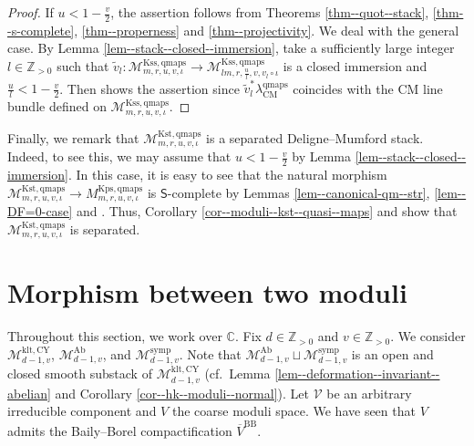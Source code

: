 \documentclass[12pt,twoside]{amsart}
\theoremstyle{definition}
\begin{document}
\begin{proof}
    If $u<1-\frac{v}{2}$, the assertion follows from Theorems \ref{thm--quot--stack}, \ref{thm--s-complete}, \ref{thm--properness} and \ref{thm--projectivity}.
We deal with the general case.
By Lemma \ref{lem--stack--closed--immersion}, take a sufficiently large integer $l\in\mathbb{Z}_{>0}$ such that  $\tilde{v}_l\colon\mathcal{M}^{\mathrm{Kss,qmaps}}_{m,r,u,v,\iota}\to\mathcal{M}^{\mathrm{Kss,qmaps}}_{lm,r,\frac{u}{l},v,v_l\circ\iota}$ is a closed immersion and $\frac{u}{l}<1-\frac{v}{2}$.
Then \cite[Lemma 4.14]{alper} shows the assertion since $\tilde{v}_l^*\lambda_{\mathrm{CM}}^{\mathrm{qmaps}}$ coincides with the CM line bundle defined on $\mathcal{M}^{\mathrm{Kss,qmaps}}_{m,r,u,v,\iota}$.
\end{proof}

Finally, we remark that $\mathcal{M}^{\mathrm{Kst,qmaps}}_{m,r,u,v,\iota}$ is a separated Deligne--Mumford stack.
Indeed, to see this, we may assume that $u<1-\frac{v}{2}$ by Lemma \ref{lem--stack--closed--immersion}.
In this case, it is easy to see that the natural morphism $\mathcal{M}^{\mathrm{Kst,qmaps}}_{m,r,u,v,\iota}\to M^{\mathrm{Kps,qmaps}}_{m,r,u,v,\iota}$ is $\mathsf{S}$-complete by Lemmas \ref{lem--canonical-qm--str}, \ref{lem--DF=0-case} and \cite[Proposition 3.43 (3)]{AHLH}.
Thus, Corollary \ref{cor--moduli--kst--quasi--maps} and \cite[Proposition 3.46]{AHLH} show that $\mathcal{M}^{\mathrm{Kst,qmaps}}_{m,r,u,v,\iota}$ is separated.



\section{Morphism between two moduli}
\label{sec4}
Throughout this section, we work over $\mathbb{C}$.
Fix $d\in\mathbb{Z}_{>0}$ and $v\in\mathbb{Z}_{>0}$. 
We consider $\mathcal{M}_{d-1,v}^{\mathrm{klt},\mathrm{CY}}$, $\mathcal{M}_{d-1,v}^{\mathrm{Ab}}$, and $\mathcal{M}_{d-1,v}^{\mathrm{symp}}$.
Note that $\mathcal{M}_{d-1,v}^{\mathrm{Ab}}\sqcup\mathcal{M}_{d-1,v}^{\mathrm{symp}}$ is an open and closed smooth substack of $\mathcal{M}_{d-1,v}^{\mathrm{klt},\mathrm{CY}}$ (cf.~Lemma \ref{lem--deformation--invariant--abelian} and Corollary \ref{cor--hk--moduli--normal}).
Let $\mathcal{V}$ be an arbitrary irreducible component and $V$ the coarse moduli space.
We have seen that $V$ admits the Baily--Borel compactification $\overline{V}^{\mathrm{BB}}$. 
\end{document}
